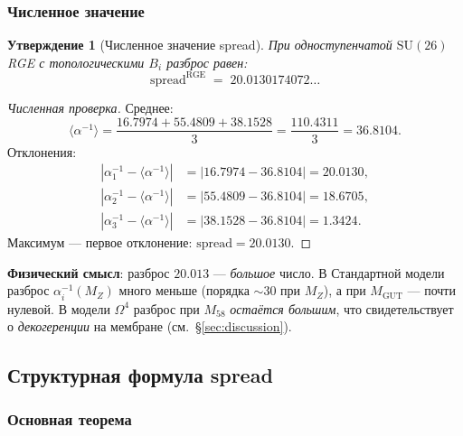 \documentclass[11pt,a4paper]{article}
\newcommand{\SU}{\ensuremath{\mathrm{SU}}}
\newcommand{\Om}{\ensuremath{\Omega^4}}
\newtheorem{proposition}[theorem]{Утверждение}
\theoremstyle{definition}
\begin{document}
\subsubsection{Численное значение}

\begin{proposition}[Численное значение spread]
\label{prop:spread-numerical}
При одноступенчатой $\SU(26)$ RGE с топологическими $B_i$
разброс равен:
\begin{equation}
    \boxed{
    \text{spread}^{\text{RGE}} \;=\; 20.0130174072\ldots
    }
    \label{eq:spread-rge-value}
\end{equation}
\end{proposition}

\begin{proof}[Численная проверка]
Среднее:
\begin{equation}
    \langle \alpha^{-1} \rangle = \frac{16.7974 + 55.4809 + 38.1528}{3}
    = \frac{110.4311}{3} = 36.8104.
\end{equation}
Отклонения:
\begin{align}
    |\alpha_1^{-1} - \langle \alpha^{-1} \rangle|
    &= |16.7974 - 36.8104| = 20.0130, \\
    |\alpha_2^{-1} - \langle \alpha^{-1} \rangle|
    &= |55.4809 - 36.8104| = 18.6705, \\
    |\alpha_3^{-1} - \langle \alpha^{-1} \rangle|
    &= |38.1528 - 36.8104| = 1.3424.
\end{align}
Максимум --- первое отклонение: $\text{spread} = 20.0130$.
\end{proof}

\medskip\noindent
\textbf{Физический смысл}: разброс $20.013$ --- \emph{большое}
число. В Стандартной модели разброс $\alpha_i^{-1}(M_Z)$
много меньше (порядка $\sim 30$ при $M_Z$), а при $M_{\text{GUT}}$
--- почти нулевой. В модели $\Om$ разброс при $M_{58}$
\emph{остаётся большим}, что свидетельствует о \emph{декогеренции}
на мембране (см.~\S\ref{sec:discussion}).

\subsection{Структурная формула spread}
\label{subsec:spread-formula}

\subsubsection{Основная теорема}
\end{document}
